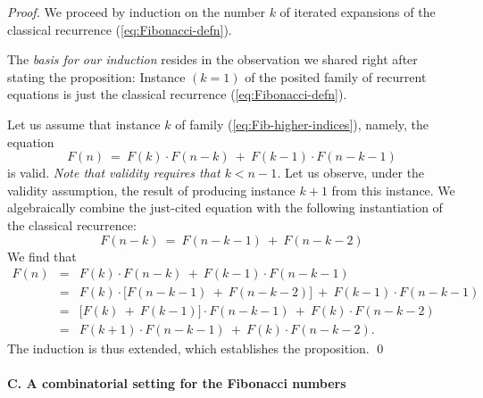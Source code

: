 \begin{proof}
\noindent {}
\bigskip

We proceed by induction on the number $k$ of iterated expansions of
the classical recurrence (\ref{eq:Fibonacci-defn}).

The {\em basis for our induction} resides in the observation we shared
right after stating the proposition: Instance $(k = 1)$ of the posited
family of recurrent equations is just the classical recurrence
(\ref{eq:Fibonacci-defn}).

Let us assume that instance $k$ of family
(\ref{eq:Fib-higher-indices}), namely, the equation
\[ F(n) \ = \ F(k) \cdot F(n-k) \ + \ F(k-1) \cdot F(n-k-1) \]
is valid.  {\em Note that validity requires that $k < n-1$.}
Let us observe, under the validity assumption, the result of producing
instance $k+1$ from this instance.  We algebraically combine the
just-cited equation with the following instantiation of the classical
recurrence:
\[ F(n-k) \ = \ F(n-k-1) \ + \ F(n-k-2) \]
We find that
\begin{eqnarray*}
F(n) & = & F(k) \cdot F(n-k) \ + \ F(k-1) \cdot F(n-k-1) \\
     & = & F(k) \cdot \big[ F(n-k-1) \ + \ F(n-k-2) \big]  \ +
             \ F(k-1) \cdot F(n-k-1) \\
     & = & \big[ F(k) \ + \ F(k-1) \big] \cdot F(n-k-1) \ + \ F(k)
             \cdot F(n-k-2) \\
     & = & F(k+1) \cdot F(n-k-1) \ + \ F(k) \cdot F(n-k-2).
\end{eqnarray*}
The induction is thus extended, which establishes the proposition.
\qed 
\end{proof}


\paragraph{C. A combinatorial setting for the Fibonacci numbers}

